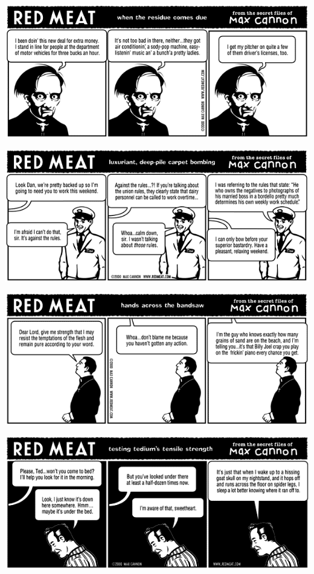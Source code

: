 \documentclass[a4paper,twoside,11pt]{article}
\begin{document}
\includegraphics[width=\textwidth]{redmeat_2000-07-11.png}



\includegraphics[width=\textwidth]{redmeat_2000-07-18.png}



\includegraphics[width=\textwidth]{redmeat_2000-07-24.png}



\includegraphics[width=\textwidth]{redmeat_2000-07-25.png}
\end{document}
